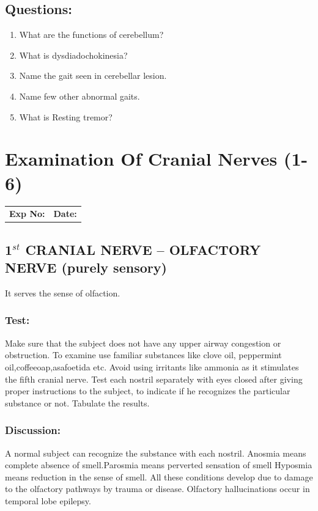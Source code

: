 \documentclass[a4paper,12pt]{book}
\begin{document}
											\section*{Questions:}
											\begin{enumerate}
\item{ What are the functions of cerebellum?}
\item{ What is dysdiadochokinesia?}
\item{ Name the gait seen in cerebellar lesion.}
\item{ Name few other abnormal gaits.}
\item{ What is Resting tremor?}
											\end{enumerate}

															\chapter*{\centering Examination Of Cranial Nerves (1-6)}
															\begin{tabular}{p{5in} p{1in}}
																\textbf{Exp No:}  & \textbf{Date:}\\
															\end{tabular}
\section*{1$^{st}$ CRANIAL NERVE – OLFACTORY NERVE (purely sensory)}
It serves the sense of olfaction.
\subsection*{Test:}
Make sure that the subject does not have any upper airway congestion or obstruction. To examine use familiar substances like clove oil, peppermint oil,coffeeoap,asafoetida etc. Avoid using irritants like ammonia as it stimulates the fifth cranial nerve.
Test each nostril separately with eyes closed after giving proper instructions to the subject, to indicate if he recognizes the particular substance or not. Tabulate the results.
\subsection*{Discussion:}
A normal subject can recognize the substance with each nostril.
	Anosmia means complete absence of smell.Parosmia means perverted sensation of smell Hyposmia means reduction in the sense of smell. All these conditions develop due to damage to the olfactory pathways by trauma or disease. Olfactory hallucinations occur in temporal lobe epilepsy.
\end{document}
